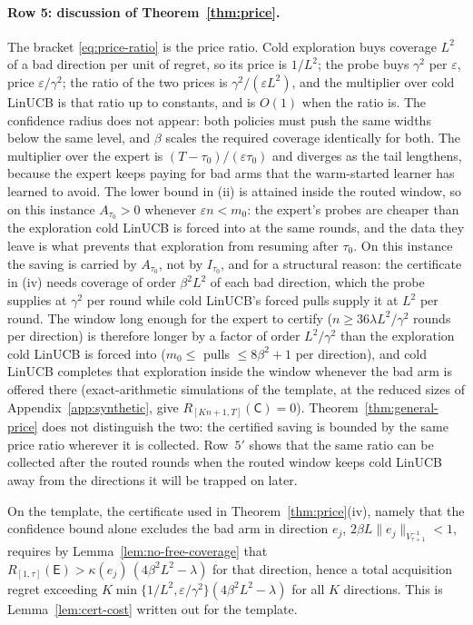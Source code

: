 \documentclass[anon]{alt2027} %
\newcommand{\eps}{\varepsilon}
\newcommand{\Cold}{\mathsf{C}}
\newcommand{\Exp}{\mathsf{E}}
\begin{document}
\paragraph{Row 5: discussion of Theorem~\ref{thm:price}.}
The bracket \eqref{eq:price-ratio} is the price ratio. Cold exploration buys
coverage $L^2$ of a bad direction per unit of regret, so its price is $1/L^2$;
the probe buys $\gamma^2$ per $\eps$, price $\eps/\gamma^2$; the ratio of the two prices
is $\gamma^2/(\eps L^2)$, and the multiplier over cold LinUCB is that ratio up to
constants, and is $O(1)$ when the ratio is. The confidence radius does not
appear: both policies must push the same widths below the same level, and
$\beta$ scales the required coverage identically for both. The multiplier
over the expert is $(T-\tau_0)/(\eps\tau_0)$ and diverges as the tail
lengthens, because the expert keeps paying for bad arms that the warm-started
learner has learned to avoid. The lower bound in (ii) is attained inside the
routed window, so on this instance $A_{\tau_0}>0$ whenever $\eps n<m_0$: the
expert's probes are cheaper than the exploration cold LinUCB is forced into
at the same rounds, and the data they leave is what prevents that exploration
from resuming after $\tau_0$. On this instance the saving is carried by
$A_{\tau_0}$, not by $I_{\tau_0}$, and for a structural reason: the
certificate in (iv) needs coverage of order $\beta^2L^2$ of each bad
direction, which the probe supplies at $\gamma^2$ per round while cold LinUCB's
forced pulls supply it at $L^2$ per round. The window long enough for the
expert to certify ($n\ge36\lambda L^2/\gamma^2$ rounds per direction) is therefore
longer by a factor of order $L^2/\gamma^2$ than the exploration cold LinUCB is
forced into ($m_0\le$ pulls $\le 8\beta^2+1$ per direction), and cold LinUCB
completes that exploration inside the window whenever the bad arm is offered
there (exact-arithmetic simulations of the template, at the reduced sizes of
Appendix~\ref{app:synthetic}, give $R_{[Kn+1,T]}(\Cold)=0$). Theorem~\ref{thm:general-price}
does not distinguish the two: the certified saving is bounded by the
same price ratio wherever it is collected. Row~$5'$ shows that the same ratio
can be collected after the routed rounds when the routed window keeps cold
LinUCB away from the directions it will be trapped on later.

\begin{remark}
On the template, the certificate used in Theorem~\ref{thm:price}(iv), namely
that the confidence bound alone excludes the bad arm in direction $e_j$,
$2\beta L\|e_j\|_{V_{\tau+1}^{-1}}<1$, requires by
Lemma~\ref{lem:no-free-coverage} that
$R_{[1,\tau]}(\Exp)>\kappa(e_j)\,(4\beta^2L^2-\lambda)$ for that direction, hence
a total acquisition regret exceeding
$K\min\{1/L^2,\eps/\gamma^2\}(4\beta^2L^2-\lambda)$ for all $K$ directions. This is
Lemma~\ref{lem:cert-cost} written out for the template.
\end{remark}
\end{document}
